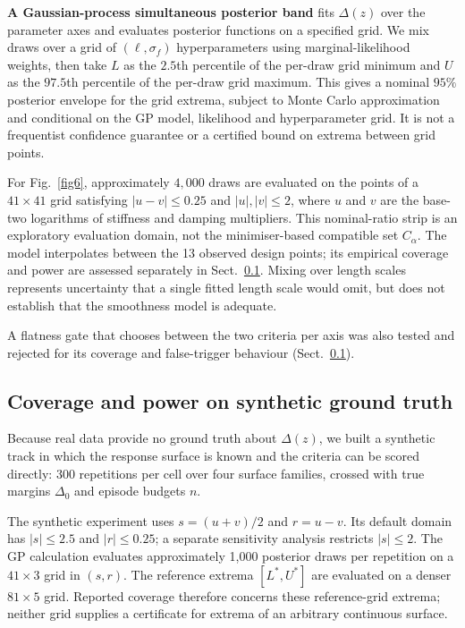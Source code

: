 \documentclass[pdflatex,iicol,sn-apa]{sn-jnl}
\theoremstyle{remark}
\begin{document}
\textbf{A Gaussian-process simultaneous posterior band} fits $\Delta(z)$ over the parameter axes
and evaluates posterior functions on a specified grid. We mix draws over a grid of
$(\ell, \sigma_f)$ hyperparameters using marginal-likelihood weights, then take $L$ as the
$2.5$th percentile of the per-draw grid minimum and $U$ as the $97.5$th percentile of the per-draw
grid maximum. This gives a nominal $95\%$ posterior envelope for the grid extrema, subject to
Monte Carlo approximation and conditional on the GP model, likelihood and hyperparameter grid.
It is not a frequentist confidence guarantee or a certified bound on extrema between grid points.

For Fig.~\ref{fig6}, approximately $4{,}000$ draws are evaluated on the points of a
$41\times41$ grid satisfying $|u-v|\le0.25$ and $|u|,|v|\le2$, where $u$ and $v$ are the
base-two logarithms of stiffness and damping multipliers. This nominal-ratio strip is an
exploratory evaluation domain, not the minimiser-based compatible set $C_\alpha$.
The model interpolates between the 13 observed design points; its empirical coverage and power
are assessed separately in Sect.~\ref{subsec8_2}. Mixing over length scales represents uncertainty
that a single fitted length scale would omit, but does not establish that the smoothness model
is adequate.

A flatness gate that chooses between the two criteria per axis was also tested and rejected
for its coverage and false-trigger behaviour (Sect.~\ref{subsec8_2}).

\subsection{Coverage and power on synthetic ground truth}\label{subsec8_2}

Because real data provide no ground truth about $\Delta(z)$, we built a synthetic track in which the
response surface is known and the criteria can be scored directly: 300 repetitions per cell over
four surface families, crossed with true margins $\Delta_0$ and episode budgets $n$.

The synthetic experiment uses $s=(u+v)/2$ and $r=u-v$. Its default domain has $|s|\le2.5$
and $|r|\le0.25$; a separate sensitivity analysis restricts $|s|\le2$.
The GP calculation evaluates approximately 1{,}000 posterior draws per repetition on a
$41\times3$ grid in $(s,r)$. The reference extrema $[L^*,U^*]$ are evaluated on a denser
$81\times5$ grid. Reported coverage therefore concerns these reference-grid extrema;
neither grid supplies a certificate for extrema of an arbitrary continuous surface.
\end{document}
